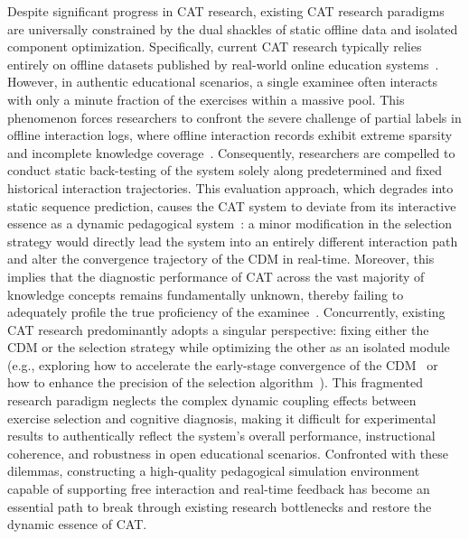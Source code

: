
Despite significant progress in CAT research, existing CAT research paradigms are universally constrained by the dual shackles of static offline data and isolated component optimization. Specifically, current CAT research typically relies entirely on offline datasets published by real-world online education systems~\cite{zhuang2026survey}. However, in authentic educational scenarios, a single examinee often interacts with only a minute fraction of the exercises within a massive pool. This phenomenon forces researchers to confront the severe challenge of partial labels in offline interaction logs, where offline interaction records exhibit extreme sparsity and incomplete knowledge coverage~\cite{yao2023exploiting}. Consequently, researchers are compelled to conduct static back-testing of the system solely along predetermined and fixed historical interaction trajectories. This evaluation approach, which degrades into static sequence prediction, causes the CAT system to deviate from its interactive essence as a dynamic pedagogical system~\cite{zhuang2022fully}: a minor modification in the selection strategy would directly lead the system into an entirely different interaction path and alter the convergence trajectory of the CDM in real-time. Moreover, this implies that the diagnostic performance of CAT across the vast majority of knowledge concepts remains fundamentally unknown, thereby failing to adequately profile the true proficiency of the examinee~\cite{ma2024enhancing}. Concurrently, existing CAT research predominantly adopts a singular perspective: fixing either the CDM or the selection strategy while optimizing the other as an isolated module (e.g., exploring how to accelerate the early-stage convergence of the CDM~\cite{liu2025fast} or how to enhance the precision of the selection algorithm~\cite{wang2025explicit}). This fragmented research paradigm neglects the complex dynamic coupling effects between exercise selection and cognitive diagnosis, making it difficult for experimental results to authentically reflect the system's overall performance, instructional coherence, and robustness in open educational scenarios. Confronted with these dilemmas, constructing a high-quality pedagogical simulation environment capable of supporting free interaction and real-time feedback has become an essential path to break through existing research bottlenecks and restore the dynamic essence of CAT.


